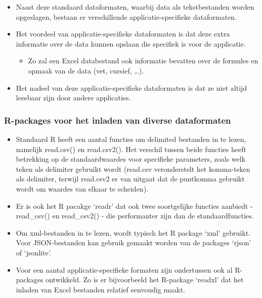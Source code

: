 \documentclass[]{tufte-book}
\providecommand{\tightlist}{%
  \setlength{\itemsep}{0pt}\setlength{\parskip}{0pt}}
\begin{document}
\begin{itemize}
\tightlist
\item
  Naast deze standaard dataformaten, waarbij data als tekstbestanden worden opgeslagen, bestaan er verschillende applicatie-specifieke dataformaten.
\item
  Het voordeel van applicatie-specifieke dataformaten is dat deze extra informatie over de data kunnen opslaan die specifiek is voor de applicatie.

  \begin{itemize}
  \tightlist
  \item
    Zo zal een Excel databestand ook informatie bevatten over de formules en opmaak van de data (vet, cursief, \ldots).
  \end{itemize}
\item
  Het nadeel van deze applicatie-specifieke dataformaten is dat ze niet altijd leesbaar zijn door andere applicaties.
\end{itemize}

\hypertarget{r-packages-voor-het-inladen-van-diverse-dataformaten}{%
\subsubsection{R-packages voor het inladen van diverse dataformaten}\label{r-packages-voor-het-inladen-van-diverse-dataformaten}}

\begin{itemize}
\tightlist
\item
  Standaard R heeft een aantal functies om delimited bestanden in te lezen, namelijk read.csv() en read.csv2(). Het verschil tussen beide functies heeft betrekking op de standaardwaardes voor specifieke parameters, zoals welk teken als delimiter gebruikt wordt (read.csv veronderstelt het komma-teken als delimiter, terwijl read.csv2 er van uitgaat dat de puntkomma gebruikt wordt om waardes van elkaar te scheiden).
\item
  Er is ook het R pacakge `readr' dat ook twee soortgelijke functies aanbiedt - read\_csv() en read\_csv2() - die performanter zijn dan de standaardfuncties.
\item
  Om xml-bestanden in te lezen, wordt typisch het R package `xml' gebruikt. Voor JSON-bestanden kan gebruik gemaakt worden van de packages `rjson' of `jsonlite'.
\item
  Voor een aantal applicatie-specifieke formaten zijn ondertussen ook al R-packages ontwikkeld. Zo is er bijvoorbeeld het R-package `readxl' dat het inladen van Excel bestanden relatief eenvoudig maakt.
\end{itemize}
\end{document}
